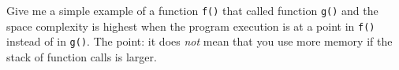Give me a simple example of a function \verb!f()! that called
  function \verb!g()! and the space complexity is highest when
  the program execution is at a point in \verb!f()! instead of
  in \verb!g()!.
  The point: it does \textit{not} mean that you use more memory
  if the stack of function calls is larger.
